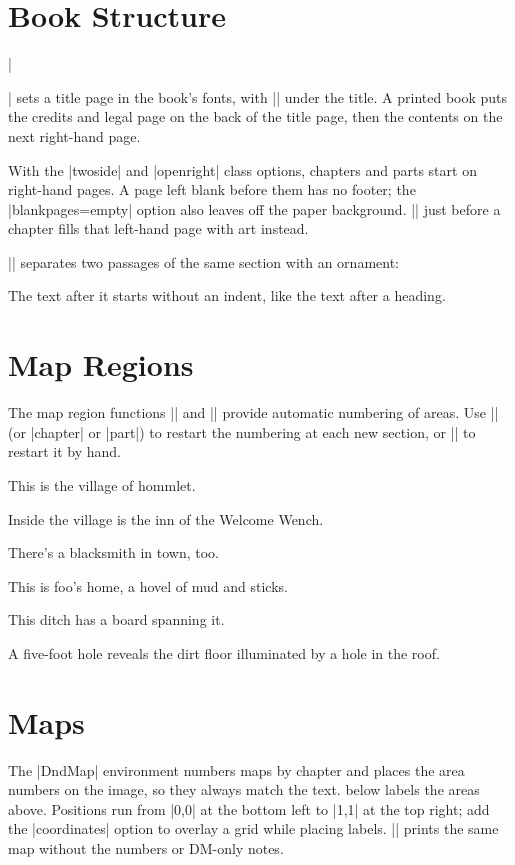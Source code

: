 \documentclass[letterpaper,twocolumn,openany,nodeprecatedcode,srd=5.1]{dndbook}
\begin{document}
\section{Book Structure}
|\maketitle| sets a title page in the book's fonts, with |\DndSubtitle| under the title. A printed book puts the credits and legal page on the back of the title page, then the contents on the next right-hand page.

With the |twoside| and |openright| class options, chapters and parts start on right-hand pages. A page left blank before them has no footer; the |blankpages=empty| option also leaves off the paper background. || just before a chapter fills that left-hand page with art instead.

|\DndSectionBreak| separates two passages of the same section with an ornament:

\DndSectionBreak

The text after it starts without an indent, like the text after a heading.

\section{Map Regions}
The map region functions |\DndArea| and |\DndSubArea| provide automatic numbering of areas. Use |\DndSetAreaOptions[area-reset=section]| (or |chapter| or |part|) to restart the numbering at each new section, or |\DndResetAreas| to restart it by hand.

This is the village of hommlet.

Inside the village is the inn of the Welcome Wench.

There's a blacksmith in town, too.

This is foo's home, a hovel of mud and sticks.

This ditch has a board spanning it.

A five-foot hole reveals the dirt floor illuminated by a hole in the roof.

\section{Maps}
The |DndMap| environment numbers maps by chapter and places the area numbers on the image, so they always match the text.  below labels the areas above. Positions run from |0,0| at the bottom left to |1,1| at the top right; add the |coordinates| option to overlay a grid while placing labels. |\DndPlayerMap| prints the same map without the numbers or DM-only notes.
\end{document}

